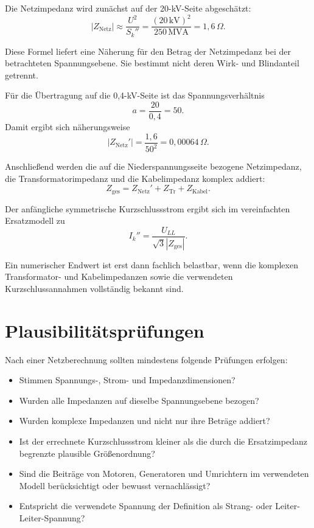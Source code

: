 Die Netzimpedanz wird zunächst auf der 20-kV-Seite abgeschätzt:
\[
  |Z_{\mathrm{Netz}}|
  \approx\frac{U^2}{S_k''}
  =\frac{(20\,\mathrm{kV})^2}{250\,\mathrm{MVA}}
  =1{,}6\,\Omega.
\]

Diese Formel liefert eine Näherung für den Betrag der Netzimpedanz bei
der betrachteten Spannungsebene. Sie bestimmt nicht deren Wirk- und
Blindanteil getrennt.

Für die Übertragung auf die 0{,}4-kV-Seite ist das Spannungsverhältnis
\[
  a=\frac{20}{0{,}4}=50.
\]
Damit ergibt sich näherungsweise
\[
  |Z_{\mathrm{Netz}}'|=\frac{1{,}6}{50^2}
  =0{,}00064\,\Omega.
\]

Anschließend werden die auf die Niederspannungsseite bezogene Netzimpedanz,
die Transformatorimpedanz und die Kabelimpedanz komplex addiert:
\[
  Z_{\mathrm{ges}}
  =Z_{\mathrm{Netz}}'+Z_{\mathrm{Tr}}+Z_{\mathrm{Kabel}}.
\]

Der anfängliche symmetrische Kurzschlussstrom ergibt sich im vereinfachten
Ersatzmodell zu
\[
  I_k''=\frac{U_{LL}}{\sqrt{3}|Z_{\mathrm{ges}}|}.
\]

Ein numerischer Endwert ist erst dann fachlich belastbar, wenn die
komplexen Transformator- und Kabelimpedanzen sowie die verwendeten
Kurzschlussannahmen vollständig bekannt sind.

\section{Plausibilitätsprüfungen}

Nach einer Netzberechnung sollten mindestens folgende Prüfungen erfolgen:
\begin{itemize}
  \item Stimmen Spannungs-, Strom- und Impedanzdimensionen?
  \item Wurden alle Impedanzen auf dieselbe Spannungsebene bezogen?
  \item Wurden komplexe Impedanzen und nicht nur ihre Beträge addiert?
  \item Ist der errechnete Kurzschlussstrom kleiner als die durch die
        Ersatzimpedanz begrenzte plausible Größenordnung?
  \item Sind die Beiträge von Motoren, Generatoren und Umrichtern
        im verwendeten Modell berücksichtigt oder bewusst vernachlässigt?
  \item Entspricht die verwendete Spannung der Definition als Strang-
        oder Leiter-Leiter-Spannung?
\end{itemize}

